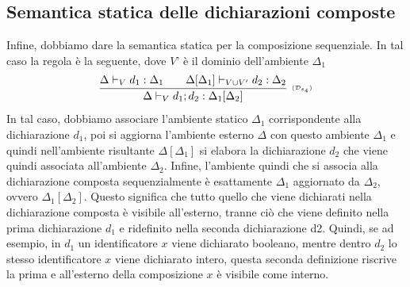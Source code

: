\documentclass[oneside,a4paper,11pt]{book}
\theoremstyle{italicstyle}
\theoremstyle{normStyle}
\begin{document}
\subsection{Semantica statica delle dichiarazioni composte}
Infine, dobbiamo dare la semantica statica per la composizione sequenziale.
In tal caso la regola è la seguente, dove $V’$ è il dominio dell’ambiente $\Delta_1$
\[
  \infer[\scriptscriptstyle (\mathcal{D}_{s_4})]
    {
      \Delta \vdash_V d_1;d_2:\Delta_1[\Delta_2]
    }
    {
      \Delta \vdash_V d_1 : \Delta_1 \qquad \Delta[\Delta_1]\vdash_{V \cup V'}d_2:\Delta_2
    }
\]
In tal caso, dobbiamo associare l’ambiente statico $\Delta_1$ corrispondente alla dichiarazione
$d_1$, poi si aggiorna l’ambiente esterno $\Delta$ con questo ambiente
$\Delta_1$ e quindi nell’ambiente risultante $\Delta[\Delta_1]$ si elabora
la dichiarazione $d_2$
che viene quindi associata all’ambiente $\Delta_2$. Infine,
l’ambiente quindi che si associa alla dichiarazione composta
sequenzialmente è esattamente $\Delta_1$ aggiornato
da $\Delta_2$, ovvero $\Delta_1[\Delta_2]$. Questo significa che tutto
quello che viene dichiarati nella dichiarazione composta è visibile
all’esterno, tranne ciò che viene definito nella prima
dichiarazione $d_1$ e ridefinito nella seconda dichiarazione
d2. Quindi, se ad esempio, in $d_1$ un identificatore $x$ viene
dichiarato booleano, mentre dentro $d_2$ lo stesso
identificatore $x$ viene dichiarato intero, questa seconda
definizione riscrive la prima e all’esterno della
composizione $x$ è visibile come interno.
\end{document}
